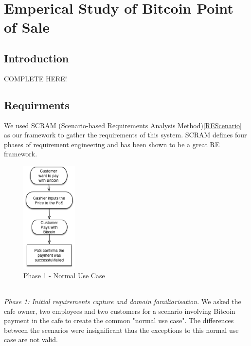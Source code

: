 

\chapter{Emperical Study of Bitcoin Point of Sale}


\section{Introduction}

COMPLETE HERE!

\section {Requirments}

We used SCRAM (Scenario-based Requirements Analysis Method)\ref{REScenario} as our framework to gather the requirements of this system.
SCRAM defines four phases of requirement engineering and has been shown to be a great RE framework.

\begin{figure}[h]
\centering
\includegraphics[width=0.25\textwidth]{fig/RE_Scenario_Phase1}
  \caption{Phase 1 - Normal Use Case}
\label{fig:phase1}
\end{figure}

\\

\textit{Phase 1: Initial requirements capture and domain familiarisation.} We asked the cafe owner, two employees and two customers for a scenario involving Bitcoin payment in the cafe to create the common "normal use case". The differences between the scenarios were insignificant thus the exceptions to this normal use case are not valid. %



